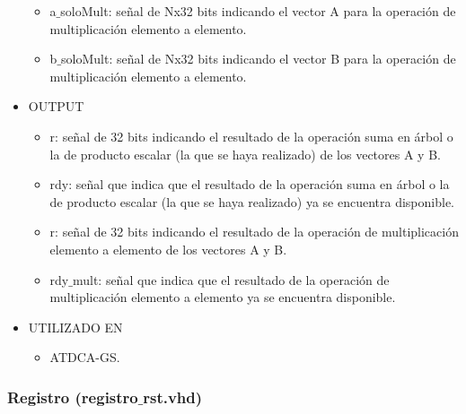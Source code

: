 \begin{itemize}
\begin{itemize}
            \item a$\_$soloMult: señal de Nx32 bits indicando el vector A para la operación de multiplicación elemento a elemento.
            \item b$\_$soloMult: señal de Nx32 bits indicando el vector B para la operación de multiplicación elemento a elemento.
        \end{itemize}
    \item OUTPUT
        \begin{itemize}
            \item r: señal de 32 bits indicando el resultado de la operación suma en árbol o la de producto escalar (la que se haya realizado) de los vectores A y B.
            \item rdy: señal que indica que el resultado de la operación suma en árbol o la de producto escalar (la que se haya realizado) ya se encuentra disponible.
            \item r: señal de 32 bits indicando el resultado de la operación de multiplicación elemento a elemento de los vectores A y B.
            \item rdy$\_$mult: señal que indica que el resultado de la operación de multiplicación elemento a elemento ya se encuentra disponible.
        \end{itemize}
    \item UTILIZADO EN
        \begin{itemize}
            \item ATDCA-GS.
        \end{itemize}
\end{itemize}

\subsubsection{Registro (registro$\_$rst.vhd)}

